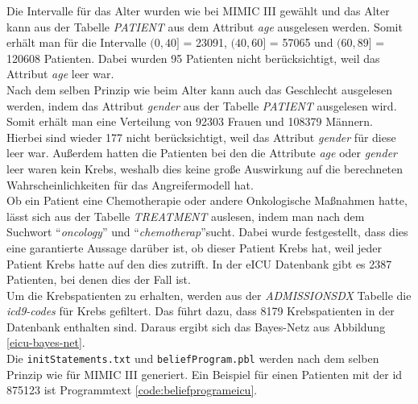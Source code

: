 \documentclass[german,version-2020-11]{uzl-thesis}
\begin{document}
Die Intervalle für das Alter wurden wie bei MIMIC III gewählt und das Alter kann aus der Tabelle \textit{PATIENT} aus dem Attribut \textit{age} ausgelesen werden. Somit erhält man für die Intervalle  $(0,40]$ = 23091,  $(40,60]$ = 57065 und $(60,89]$ = 120608 Patienten. Dabei wurden 95 Patienten nicht berücksichtigt, weil das Attribut \textit{age} leer war.\\ 
Nach dem selben Prinzip wie beim Alter kann auch das Geschlecht ausgelesen werden, indem das Attribut \textit{gender} aus der Tabelle \textit{PATIENT} ausgelesen wird. Somit erhält man eine Verteilung von 92303 Frauen und 108379 Männern. Hierbei sind wieder 177 nicht berücksichtigt, weil das Attribut \textit{gender} für diese leer war. Außerdem hatten die Patienten bei den die Attribute  \textit{age} oder \textit{gender} leer waren kein Krebs, weshalb dies keine große Auswirkung auf die berechneten Wahrscheinlichkeiten für das Angreifermodell hat.  \\
Ob ein Patient eine Chemotherapie oder andere Onkologische Maßnahmen hatte, lässt sich aus der Tabelle \textit{TREATMENT } auslesen, indem man nach dem Suchwort \enquote{\textit{oncology}} und  \enquote{\textit{chemotherap}}sucht. Dabei wurde festgestellt, dass dies eine garantierte Aussage darüber ist, ob dieser Patient Krebs hat, weil jeder Patient Krebs hatte auf den dies zutrifft. In der eICU Datenbank gibt es 2387 Patienten, bei denen dies der Fall ist. \\ 
Um die  Krebspatienten zu erhalten, werden aus der \textit{ADMISSIONSDX} Tabelle die \textit{icd9-codes} für Krebs gefiltert. Das führt dazu, dass 8179 Krebspatienten in der Datenbank enthalten sind. 
Daraus ergibt sich das Bayes-Netz aus Abbildung \ref{eicu-bayes-net}. \\ 
Die \texttt{initStatements.txt} und \texttt{beliefProgram.pbl} werden nach dem selben Prinzip wie für MIMIC III generiert. Ein Beispiel für einen Patienten mit der id 875123 ist Programmtext \ref{code:beliefprogrameicu}.
\end{document}
